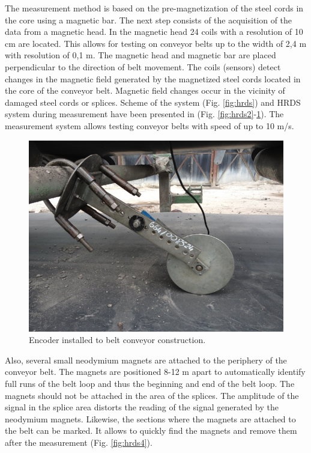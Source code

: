 \documentclass[applsci,article,preprint,moreauthors,pdftex]{Definitions/mdpi}
\begin{document}
The measurement method is based on the pre-magnetization of the steel cords in the core using a magnetic bar. The next step consists of the acquisition of the data from a magnetic head. In the magnetic head 24 coils with a resolution of 10 cm are located. This allows for testing on conveyor belts up to the width of 2,4 m with resolution of 0,1 m. The magnetic head and magnetic bar are placed perpendicular to the direction of belt movement. The coils (sensors) detect changes in the magnetic field generated by the magnetized steel cords located in the core of the conveyor belt. Magnetic field changes occur in the vicinity of damaged steel cords or splices. Scheme of the system  (Fig. \ref{fig:hrds}) and HRDS system during measurement have been presented in (Fig. \ref{fig:hrds2}-\ref{fig:hrds3}). The measurement system allows testing conveyor belts with speed of up to 10 m/s.

\begin{figure}[ht!]
\centering
\includegraphics[width=.7\textwidth]{figs/hrds3.png}
\caption{Encoder installed to belt conveyor construction.}
\label{fig:hrds3}
\end{figure}

Also, several small neodymium magnets are attached to the periphery of the conveyor belt. The magnets are positioned 8-12 m apart to automatically identify full runs of the belt loop and thus the beginning and end of the belt loop. The magnets should not be attached in the area of the splices. The amplitude of the signal in the splice area distorts the reading of the signal generated by the neodymium magnets. Likewise, the sections where the magnets are attached to the belt can be marked. It allows to quickly find the magnets and remove them after the measurement (Fig. \ref{fig:hrds4}).
\end{document}
